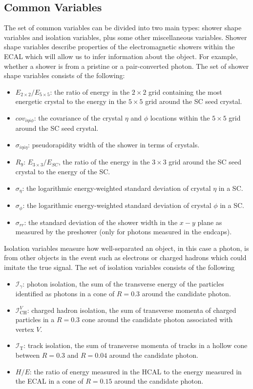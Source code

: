 \subsection{Common Variables}
The set of common variables can be divided into two main types: shower shape variables and isolation variables, plus some other miscellaneous variables. 
Shower shape variables describe properties of the electromagnetic showers within the ECAL which will allow us to infer information about the object. For example, whether a shower is from a pristine or a pair-converted photon.
The set of shower shape variables consists of the following:
\begin{itemize}[leftmargin=.5in,noitemsep]
    \item $E_{2\times{}2}/E_{5\times{}5}$: the ratio of energy in the $2\times{}2$ grid containing the most energetic crystal to the energy in the $5\times{}5$ grid around the SC seed crystal.
    \item $cov_{i\eta{i}\phi}$: the covariance of the crystal $\eta$ and $\phi$ locations within the $5\times{}5$ grid around the SC seed crystal. 
    \item $\sigma_{i\eta{}i\eta}$: pseudorapidity width of the shower in terms of crystals. 
    \item $R_{9}$: $E_{3\times{}3}/E_{SC}$, the ratio of the energy in the $3\times{}3$ grid around the SC seed crystal to the energy of the SC.
    \item $\sigma_{\eta}$: the logarithmic energy-weighted standard deviation of crystal $\eta$ in a SC.
    \item $\sigma_{\phi}$: the logarithmic energy-weighted standard deviation of crystal $\phi$ in a SC.
    \item $\sigma_{rr}$: the standard deviation of the shower width in the $x-y$ plane as measured by the preshower (only for photons measured in the endcaps).
\end{itemize}


Isolation variables measure how well-separated an object, in this case a photon, is from other objects in the event such as electrons or charged hadrons which could imitate the true signal. The set of isolation variables consists of the following
\begin{itemize}[leftmargin=.5in,noitemsep]
    \item $\mathcal{I}_{\gamma}$: photon isolation, the sum of the transverse energy of the particles identified as photons in a cone of $R=0.3$ around the candidate photon.
    \item $\mathcal{I}^{V}_{\mathrm{CH}}$: charged hadron isolation, the sum of transverse momenta of charged particles in a $R=0.3$ cone around the candidate photon associated with vertex $V$. 
    \item $\mathcal{I}_{\mathrm{T}}$: track isolation, the sum of transverse momenta of tracks in a hollow cone between $R=0.3$ and $R=0.04$ around the candidate photon.
    \item $H/E$: the ratio of energy measured in the HCAL to the energy measured in the ECAL in a cone of $R=0.15$ around the candidate photon.
\end{itemize}

